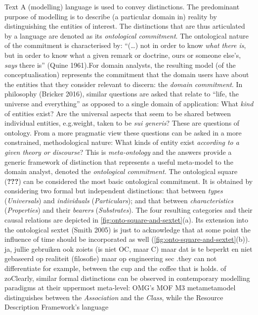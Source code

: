 \documentclass[a4paper,11pt,oneside,oldfontcommands]{memoir}
\newcounter{para}
\theoremstyle{definition}
\theoremstyle{break}		%
\numberwithin{equation}{chapter}
\numberwithin{figure}{chapter}
\begin{document}
Text A (modelling) language is used to convey distinctions. The
predominant purpose of modelling is to describe (a particular domain in)
reality by distinguishing the entities of interest. The distinctions
that are thus articulated by a language are denoted as its
\emph{ontological commitment}. The ontological nature of the commitment
is characterised by: ``(\ldots{}) not in order to know \emph{what there
is}, but in order to know what a given remark or doctrine, ours or
someone else's, \emph{says} there is'' (Quine 1961).For domain analysts,
the resulting model (of the conceptualisation) represents the commitment
that the domain users have about the entities that they consider
relevant to discern: the \emph{domain commitment}. In philosophy
(Bricker 2016), similar questions are asked that relate to ``life, the
universe and everything'' as opposed to a single domain of application:
What \emph{kind} of entities exist? Are the universal aspects that seem
to be shared between individual entities, e.g.weight, taken to be
\emph{sui generis}? These are questions of ontology. From a more
pragmatic view these questions can be asked in a more constrained,
methodological nature: What kinds of entity exist \emph{according to a
given theory or discourse}? This is \emph{meta-ontology} and the answers
provide a generic framework of distinction that represents a useful
meta-model to the domain analyst, denoted the \emph{ontological
commitment. } The ontological square ({\textbf{???}}) can be considered
the most basic ontological commitment. It is obtained by considering two
formal but independent distinctions: that between \emph{types}
(\emph{Universals}) and \emph{individuals} (\emph{Particulars}); and
that between \emph{characteristics} (\emph{Properties}) and their
\emph{bearers} (\emph{Substrates}). The four resulting categories and
their causal relations are depicted in
\cref{fig:onto-square-and-sextet}(a). Its extension into the ontological
sextet (Smith 2005) is just to acknowledge that at some point the
influence of time should be incorporated as well
(\cref{fig:onto-square-and-sextet}(b)). ja, jullie gebruiken ook zoiets
(is niet OC, maar C) maar dat is te beperkt en niet gebaseerd op
realiteit (filosofie) maar op engineering sec .they can not
differentiate for example, between the cup and the coffee that is holds.
of zoClearly, similar formal distinctions can be observed in
contemporary modelling paradigms at their uppermost meta-level: OMG's
MOF M3 metametamodel distinguishes between the \emph{Association} and
the \emph{Class}, while the Resource Description Framework's language
\end{document}
